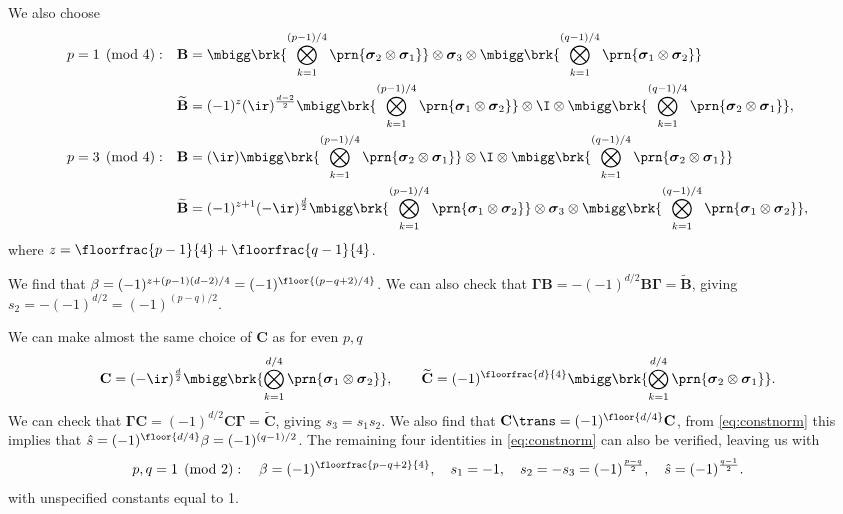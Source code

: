 \documentclass[11pt]{article}
\newcommand{\Gammab}{\boldsymbol{\Gamma}}
\newcommand{\B}{\mathbf{B}}
\renewcommand{\C}{\mathbf{C}}
\newcommand{\Bt}{\widetilde{\B}}
\newcommand{\Ct}{\widetilde{\C}}
\newcommand{\sigmab}{\boldsymbol{\sigma}}
\begin{document}
We also choose
%
\begin{equation*}
\begin{aligned}
  p &= 1 \pmod 4: &
  \B &= \mbigg\brk{\bigotimes_{k=1}^{(p-1)/4} \prn{\sigmab_2 \otimes \sigmab_1}} \otimes
        \sigmab_3 \otimes
        \mbigg\brk{\bigotimes_{k=1}^{(q-1)/4} \prn{\sigmab_1 \otimes \sigmab_2}} \\ &&
  \Bt &= (-1)^{z} (\ir)^{\frac{d-2}{2}}
        \mbigg\brk{\bigotimes_{k=1}^{(p-1)/4} \prn{\sigmab_1 \otimes \sigmab_2}} \otimes
        \I \otimes
        \mbigg\brk{\bigotimes_{k=1}^{(q-1)/4} \prn{\sigmab_2 \otimes \sigmab_1}},
  \\
  p &= 3 \pmod 4: &
  \B &= (\ir)
        \mbigg\brk{\bigotimes_{k=1}^{(p-1)/4} \prn{\sigmab_2 \otimes \sigmab_1}} \otimes
        \I \otimes
        \mbigg\brk{\bigotimes_{k=1}^{(q-1)/4} \prn{\sigmab_2 \otimes \sigmab_1}} \\ &&
  \Bt &= (-1)^{z + 1} (-\ir)^{\frac{d}{2}}
        \mbigg\brk{\bigotimes_{k=1}^{(p-1)/4} \prn{\sigmab_1 \otimes \sigmab_2}} \otimes
        \sigmab_3 \otimes
        \mbigg\brk{\bigotimes_{k=1}^{(q-1)/4} \prn{\sigmab_1 \otimes \sigmab_2}},
\end{aligned}
\end{equation*}
%
where $z = \floorfrac{p-1}{4} + \floorfrac{q-1}{4}$.

We find that \( \beta = (-1)^{z + (p-1)(d-2)/4} = (-1)^{\floor{(p-q+2)/4}} \).
We can also check that $\Gammab \B = -(-1)^{d/2}\B \Gammab = \Bt$, giving $s_2 = -(-1)^{d/2} = (-1)^{(p-q)/2}$.


We can make almost the same choice of $\C$ as for even $p,q$
%
\begin{equation*}
  \C =  (-\ir)^{\frac{d}{2}}
        \mbigg\brk{\bigotimes_{k=1}^{d/4} \prn{\sigmab_1 \otimes \sigmab_2}},
  \qquad
  \Ct = (-1)^{\floorfrac{d}{4}}
        \mbigg\brk{\bigotimes_{k=1}^{d/4} \prn{\sigmab_2 \otimes \sigmab_1}}.
\end{equation*}
%
We can check that $\Gammab \C = (-1)^{d/2}\C \Gammab = \Ct$, giving $s_3 = s_1 s_2$.
We also find that $\C\trans = (-1)^{\floor{d/4}} \C$, from \cref{eq:constnorm} this implies that
\( \hat{s} = (-1)^{\floor{d/4}} \beta = (-1)^{(q-1)/2} \).
The remaining four identities in \cref{eq:constnorm} can also be verified, leaving us with
%
\begin{equation}\label{eq:constoddodd}
  p, q = 1 \pmod 2 : \quad
  \beta = (-1)^{\floorfrac{p-q+2}{4}}, \quad
  s_1 = -1, \quad
  s_2 = -s_3 = (-1)^{\frac{p-q}{2}}, \quad
  \hat{s} = (-1)^{\frac{q-1}{2}}.
\end{equation}
%
with unspecified constants equal to 1.
\end{document}
